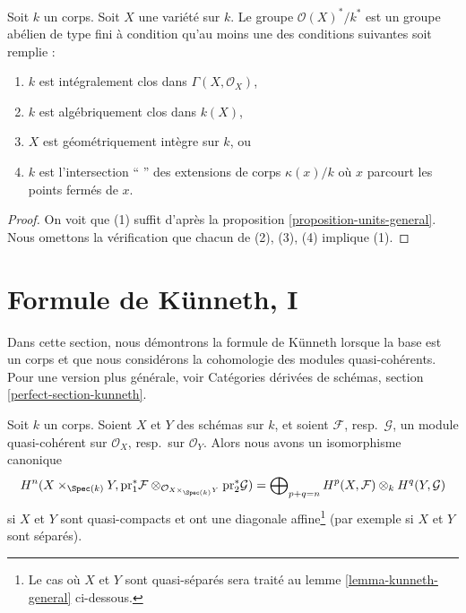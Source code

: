 \begin{lemma}
\label{lemma-units-variety}
 Soit $k$ un corps. Soit
$X$ une variété sur $k$.
Le groupe $\mathcal{O}(X)^*/k^*$ est un groupe abélien de type fini
à condition qu'au moins une des conditions suivantes soit remplie : 
\begin{enumerate}
\item $k$ est intégralement clos dans $\Gamma(X, \mathcal{O}_X)$, 
\item $k$ est algébriquement clos dans $k(X)$, 
\item $X$ est géométriquement intègre sur $k$, ou 
\item $k$ est l'intersection `` '' des extensions de corps 
$\kappa(x)/k$ où $x$ parcourt les points fermés de $x$. 
\end{enumerate}
\end{lemma}

\begin{proof}
 On voit que (1) suffit
d'après la proposition \ref{proposition-units-general}.
Nous omettons la vérification que chacun de (2), (3), (4) implique (1). 
\end{proof}







\section{Formule de K\"unneth, I} 
\label{section-kunneth}

\noindent
 Dans cette section, nous démontrons la formule de K\"unneth lorsque
la base est un corps et que nous considérons la cohomologie
des modules quasi-cohérents. Pour une version plus générale, voir
Catégories dérivées de schémas, section \ref{perfect-section-kunneth}.

\begin{lemma}
\label{lemma-kunneth}
 Soit $k$ un corps. Soient $X$ et $Y$ des schémas sur $k$, et
soient $\mathcal{F}$, resp.\ $\mathcal{G}$, un module quasi-cohérent sur 
$\mathcal{O}_X$, resp.\ sur $\mathcal{O}_Y$.
Alors nous avons un isomorphisme canonique 
$$
H^n(X \times_{\Spec(k)} Y, \text{pr}_1^*\mathcal{F}
\otimes_{\mathcal{O}_{X \times_{\Spec(k)} Y}} \text{pr}_2^*\mathcal{G}) =
\bigoplus\nolimits_{p + q = n}
H^p(X, \mathcal{F}) \otimes_k H^q(Y, \mathcal{G})
$$
 si $X$ et $Y$ sont quasi-compacts et ont une
diagonale affine\footnote{Le cas où $X$ et $Y$ sont quasi-séparés sera
traité au lemme \ref{lemma-kunneth-general} ci-dessous.}
(par exemple si $X$ et $Y$ sont séparés). 
\end{lemma}

